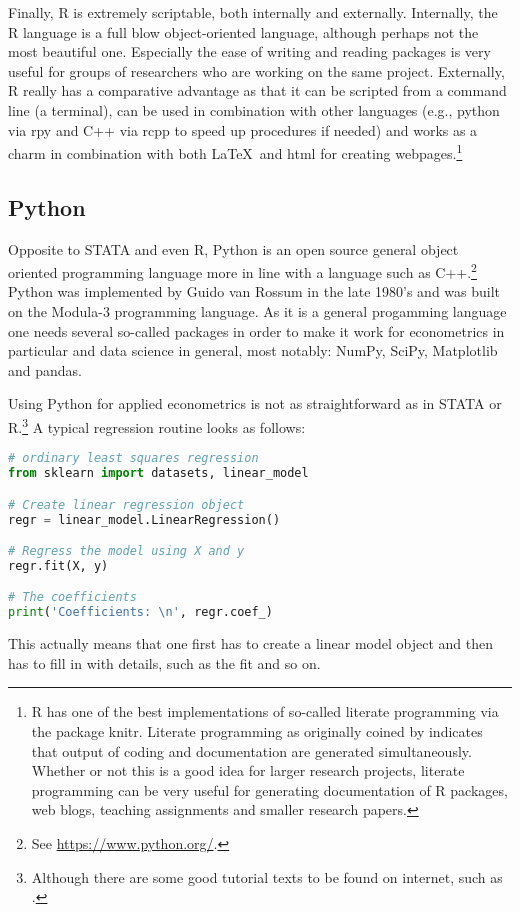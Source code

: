 \documentclass[fleqn,10pt]{SelfArx} %
\begin{document}
Finally, R is extremely scriptable, both internally and externally. Internally, the R language is a full blow object-oriented language, although perhaps not the most beautiful one. Especially the ease of writing and reading packages is very useful for groups of researchers who are working on the same project. Externally, R really has a comparative advantage as that it can be scripted from a command line (a terminal), can be used in combination with other languages (e.g., python via rpy and C++ via rcpp to speed up procedures if needed) and works as a charm in combination with both \LaTeX\ and html for creating webpages.\footnote{R has one of the best implementations of so-called literate programming via the package knitr. Literate programming as originally coined by \citet{knuth1984literate} indicates that output of coding and documentation are generated simultaneously. Whether or not this is a good idea for larger research projects, literate programming can be very useful for generating documentation of R packages, web blogs, teaching assignments and smaller research papers.}

\subsection*{Python}

Opposite to STATA and even R, Python is an open source general object oriented programming language more in line with a language such as C++.\footnote{See \href{https://www.python.org/}{https://www.python.org/}.} Python was implemented by Guido van Rossum in the late 1980's and was built on the Modula-3 programming language. As it is a general progamming language one needs several so-called packages in order to make it work for econometrics in particular and data science in general, most notably: NumPy, SciPy, Matplotlib and pandas.

Using Python for applied econometrics is not as straightforward as in STATA or R.\footnote{Although there are some good tutorial texts to be found on internet, such as \citet{sargent2015quantitative}.} A typical regression routine looks as follows:
\begin{lstlisting}[language=python]
# ordinary least squares regression
from sklearn import datasets, linear_model

# Create linear regression object
regr = linear_model.LinearRegression()

# Regress the model using X and y
regr.fit(X, y)

# The coefficients
print('Coefficients: \n', regr.coef_)
\end{lstlisting}
This actually means that one first has to create a linear model object and then has to fill in with details, such as the fit and so on. 
\end{document}

